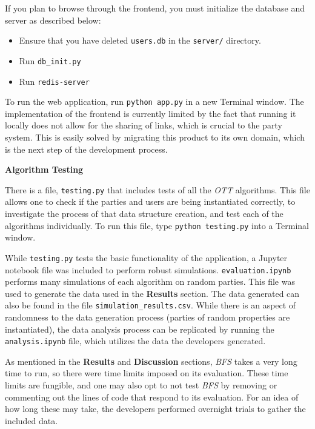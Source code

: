 \documentclass[11pt]{article}
\begin{document}
If you plan to browse through the frontend, you must initialize the database and server as described below:
\begin{itemize}
    \item Ensure that you have deleted \texttt{users.db} in the \texttt{server/} directory.
    \item Run \texttt{db\_init.py}
    \item Run \texttt{redis-server}
\end{itemize}

To run the web application, run \texttt{python app.py} in a new Terminal window. The implementation of the frontend is currently limited by the fact that running it locally does not allow for the sharing of links, which is crucial to the party system. This is easily solved by migrating this product to its own domain, which is the next step of the development process.

\textbf{Algorithm Testing}

There is a file, \texttt{testing.py} that includes tests of all the \emph{OTT} algorithms. This file allows one to check if the parties and users are being instantiated correctly, to investigate the process of that data structure creation, and test each of the algorithms individually. To run this file, type \texttt{python testing.py} into a Terminal window.

While \texttt{testing.py} tests the basic functionality of the application, a Jupyter notebook file was included to perform robust simulations. \texttt{evaluation.ipynb} performs many simulations of each algorithm on random parties. This file was  used to generate the data used in the \textbf{Results} section. The data generated can also be found in the file \texttt{simulation\_results.csv}. While there is an aspect of randomness to the data generation process (parties of random properties are instantiated), the data analysis process can be replicated by running the \texttt{analysis.ipynb} file, which utilizes the data the developers generated.

As mentioned in the \textbf{Results} and \textbf{Discussion} sections, \textit{BFS} takes a very long time to run, so there were time limits imposed on its evaluation. These time limits are fungible, and one may also opt to not test \textit{BFS} by removing or commenting out the lines of code that respond to its evaluation. For an idea of how long these may take, the developers performed overnight trials to gather the included data.

\newpage
\end{document}
